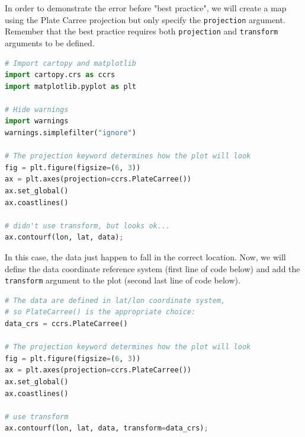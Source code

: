 \documentclass[a4paper , 12pt]{book}
\newcommand{\code}[1]{\colorbox{light-gray}{\texttt{#1}}}
\begin{document}
In order to demonstrate the error before "best practice", we will create a map using the Plate Carree projection but only specify the \code{projection} argument. Remember that the best practice requires both \code{projection} and \code{transform} arguments to be defined.

\begin{center}
\begin{lstlisting}[language=Python, frame=single]
# Import cartopy and matplotlib
import cartopy.crs as ccrs
import matplotlib.pyplot as plt

# Hide warnings
import warnings 
warnings.simplefilter("ignore")

# The projection keyword determines how the plot will look
fig = plt.figure(figsize=(6, 3))
ax = plt.axes(projection=ccrs.PlateCarree())
ax.set_global()
ax.coastlines()

# didn't use transform, but looks ok...
ax.contourf(lon, lat, data);
\end{lstlisting}
\end{center}

In this case, the data just happen to fall in the correct location. Now, we will define the data coordinate reference system (first line of code below) and add the \code{transform} argument to the plot (second last line of code below).

\begin{center}
\begin{lstlisting}[language=Python, frame=single]
# The data are defined in lat/lon coordinate system, 
# so PlateCarree() is the appropriate choice:
data_crs = ccrs.PlateCarree()

# The projection keyword determines how the plot will look
fig = plt.figure(figsize=(6, 3))
ax = plt.axes(projection=ccrs.PlateCarree())
ax.set_global()
ax.coastlines()

# use transform
ax.contourf(lon, lat, data, transform=data_crs);
\end{lstlisting}
\end{center}
\end{document}
